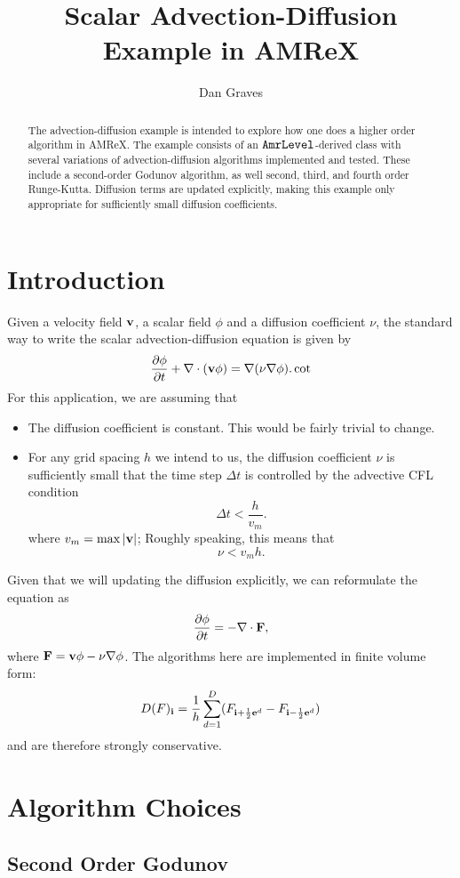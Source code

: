 \documentclass{article}
\title{Scalar Advection-Diffusion Example in AMReX}
\author{Dan Graves}
\newcommand{\ibold}{{\bf i}}
\newcommand{\ebold}{{\bf e}}
\newcommand{\vbold}{{\bf v}}
\newcommand{\Fbold}{{\bf F}}
\newcommand{\dt}{{\Delta t}}
\newcommand{\dx}{{h}}
\newcommand{\half}{\frac{1}{2}}
\newcommand{\iph}{{\ibold + \half \ebold^d}}
\newcommand{\imh}{{\ibold - \half \ebold^d}}
\begin{document}
\begin{abstract}
  The advection-diffusion example is intended to explore how one does
  a higher order algorithm in AMReX.    The example consists of an
  $\tt{AmrLevel}$-derived class with several variations of
  advection-diffusion algorithms implemented and tested.  These
  include a second-order Godunov algorithm, as well second, third, and
  fourth order Runge-Kutta.   Diffusion terms are updated explicitly,
  making this example only appropriate for sufficiently small
  diffusion coefficients.
\end{abstract}

\section{Introduction}

Given a velocity field $\vbold$, a scalar field  $\phi$ and a
diffusion coefficient $\nu$, the standard way to write the 
scalar advection-diffusion equation  is given by 
$$
\frac{\partial \phi}{\partial t} + \nabla \cdot (\vbold \phi) = \nabla
(\nu \nabla \phi).
\cot 
$$
For this application, we are assuming that 
\begin{itemize}
\item The diffusion coefficient is constant.  This would be fairly
  trivial to change.
\item For any grid spacing $\dx$ we intend to us, the diffusion
  coefficient $\nu$ is sufficiently small that the time
  step $\dt$ is controlled by the advective CFL condition
$$
\dt < \frac{\dx}{v_m}.
$$
where $v_m= \max|\vbold|$;
Roughly speaking, this means that 
$$
\nu < v_m \dx.
$$
\end{itemize}
Given that we will updating the diffusion explicitly, we can
reformulate the equation as 
$$
\frac{\partial \phi}{\partial t} =  -\nabla \cdot \Fbold, 
$$
where $\Fbold = \vbold \phi - \nu \nabla \phi$.
The algorithms here are implemented in finite volume form:
$$
D(F)_\ibold = \frac{1}{\dx} \sum^D_{d = 1} (F_{\iph} - F_\imh)
$$
and are
therefore strongly conservative.

\section{Algorithm Choices}

\subsection{Second Order Godunov} 
\end{document}
